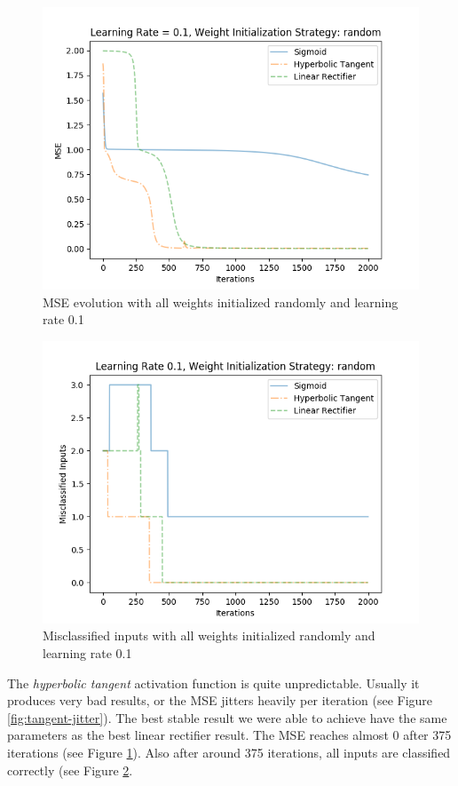 \documentclass{article}
\begin{document}
\begin{figure}[H]
	\centering
	\includegraphics[width=0.9\linewidth]{img/5/linear-rectifier-mse.png}
	\caption{MSE evolution with all weights initialized randomly and learning rate 0.1}
	\label{fig:best_result_linrect_mse}
\end{figure}

\begin{figure}[H]
	\centering
	\includegraphics[width=0.9\linewidth]{img/5/linear-rectifier-inputs.png}
	\caption{Misclassified inputs with all weights initialized randomly and learning rate 0.1}
	\label{fig:best_result_linrect_inputs}
\end{figure}


The \emph{hyperbolic tangent} activation function is quite unpredictable. Usually it produces very bad results, or the MSE jitters heavily per iteration (see Figure \ref{fig:tangent-jitter}).
The best stable result we were able to achieve have the same parameters as the best linear rectifier result. The MSE reaches almost 0 after 375 iterations (see Figure \ref{fig:best_result_linrect_mse}). Also after around 375 iterations, all inputs are classified correctly (see Figure \ref{fig:best_result_linrect_inputs}.
\end{document}
